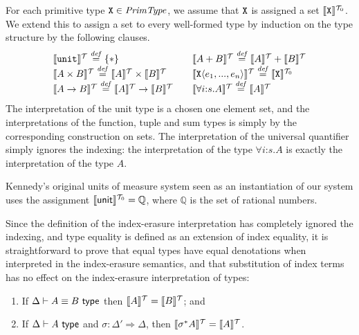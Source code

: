 For each primitive type $\texttt{X} \in \mathit{PrimType}$, we assume
that $\texttt{X}$ is assigned a set $\llbracket \texttt{X} \rrbracket^{\mathcal{T}_0}$. We
extend this to assign a set to every well-formed type by induction on
the type structure by the following clauses.
\begin{displaymath}
  \begin{array}{cc}
    \begin{array}{l}
      \llbracket \texttt{unit} \rrbracket^{\mathcal{T}} \stackrel{\mathit{def}}= \{*\} \\
      \llbracket A \times B \rrbracket^{\mathcal{T}} \stackrel{\mathit{def}}= \llbracket A \rrbracket^{\mathcal{T}} \times \llbracket B \rrbracket^{\mathcal{T}} \\
      \llbracket A \to B \rrbracket^{\mathcal{T}} \stackrel{\mathit{def}}= \llbracket A \rrbracket^{\mathcal{T}} \to \llbracket B \rrbracket^{\mathcal{T}} \\
    \end{array}
    &
    \begin{array}{l}
      \llbracket A + B \rrbracket^{\mathcal{T}} \stackrel{\mathit{def}}= \llbracket A \rrbracket^{\mathcal{T}} + \llbracket B \rrbracket^{\mathcal{T}} \\
      \llbracket \texttt{X}\langle e_1,...,e_n \rangle \rrbracket^{\mathcal{T}} \stackrel{\mathit{def}}= \llbracket \texttt{X} \rrbracket^{\mathcal{T}_0} \\
      \llbracket \forall i\mathord:s. A \rrbracket^{\mathcal{T}} \stackrel{\mathit{def}}= \llbracket A \rrbracket^{\mathcal{T}}
    \end{array}
  \end{array}
\end{displaymath}
The interpretation of the unit type is a chosen one element set, and
the interpretations of the function, tuple and sum types is simply by
the corresponding construction on sets. The interpretation of the
universal quantifier simply ignores the indexing: the interpretation
of the type $\forall i\mathord:s.A$ is exactly the interpretation of
the type $A$.

\begin{example} Kennedy's original units of measure
  system seen as an instantiation of our system uses the assignment
  $\llbracket \mathsf{unit} \rrbracket^{\mathcal{T}_0} = \mathbb{Q}$, where $\mathbb{Q}$ is the
  set of rational numbers.
\end{example}

Since the definition of the index-erasure interpretation has
completely ignored the indexing, and type equality is defined as an
extension of index equality, it is straightforward to prove that equal
types have equal denotations when interpreted in the index-erasure
semantics, and that substitution of index terms has no effect on the
index-erasure interpretation of types:
\begin{lemma}\label{lem:tyeqsubst-erasure}
  \begin{enumerate}
  \item If $\Delta \vdash A \equiv B \textsf{ type}$ then $\llbracket A \rrbracket^{\mathcal{T}} =
    \llbracket B \rrbracket^{\mathcal{T}}$; and
  \item If $\Delta \vdash A \textsf{ type}$ and $\sigma : \Delta' \Rightarrow
    \Delta$, then $\llbracket \sigma^*A \rrbracket^{\mathcal{T}} = \llbracket A \rrbracket^{\mathcal{T}}$.
  \end{enumerate}
\end{lemma}

